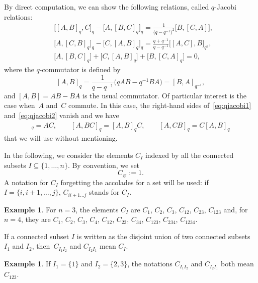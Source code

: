 \documentclass[10pt,a4paper]{amsart}
\numberwithin{equation}{section}
\theoremstyle{definition}
\newtheorem{exam}[theo]{Example}
\begin{document}
By direct computation, we can show the following relations, called $q$-Jacobi relations:
\begin{subequations}
\begin{align}
 &\bigl[[A,B]_q,C\bigr]_q-\bigl[A,[B,C]_q\bigr]_q=\frac{1}{\big(q-q^{-1}\big)^2}\bigl[B,[C,A]\bigr] , \label{eq:qjacobi1}\\
 &\bigl[A,[C,B]_q\bigr]_q-\bigl[C,[A,B]_q\bigr]_q=\frac{q+q^{-1}}{q-q^{-1}}\bigl[[A,C],B\bigr]_{q^2} ,\label{eq:qjacobi2}\\
 &\bigl[A,[B,C]_q\bigr]+\bigl[C,[A,B]_q\bigr]+\bigl[B,[C,A]_{q}\bigr]=0 ,\label{eq:qjacobi3}
\end{align}
\end{subequations}
where the $q$-commutator is defined by
\begin{equation} \label{eq:qcom}
 [A,B]_q=\frac{1}{q-q^{-1}}\big(qAB- q^{-1}BA\big)=[B,A]_{q^{-1}} ,
\end{equation}
and $[A,B]=AB-BA$ is the usual commutator.
Of particular interest is the case when~$A$ and~$C$ commute. In this case, the right-hand sides of~\eqref{eq:qjacobi1} and~\eqref{eq:qjacobi2} vanish
and we have
\begin{align*}
[A,C]_q=AC,\qquad [A,BC]_q=[A,B]_qC,\qquad [A,CB]_q=C[A,B]_q
 \end{align*}
that we will use without mentioning.

In the following, we consider the elements $C_I$ indexed by all the connected subsets $I\subseteq\{1,\dots,n\}$.
By convention, we set
\begin{equation}\label{eq:Cvide}
 C_{\varnothing}:=1 .
\end{equation}
A notation for $C_I$ forgetting the accolades for a set will be used: if $I=\{i,i+1,\dots,j\}$, $C_{ii+1\dots j}$ stands for $C_I$.
\begin{exam}
For $n=3$, the elements $C_I$ are $C_1$, $C_2$, $C_3$, $C_{12}$, $C_{23}$, $C_{123}$ and, for $n=4$, they are $C_1$, $C_2$, $C_3$, $C_4$, $C_{12}$, $C_{23}$, $C_{34}$, $C_{123}$, $C_{234}$, $C_{1234}$.
\end{exam}
 If a connected subset $I$ is written as the disjoint union of two connected subsets $I_1$ and $I_2$, then~$C_{I_1I_2}$ and $C_{I_2I_1}$ mean $C_I$.
\begin{exam}
If $I_1=\{1\}$ and $I_2=\{2,3\}$, the notations $C_{I_1I_2}$ and $C_{I_2I_1}$ both mean $C_{123}$.
\end{exam}
\end{document}
